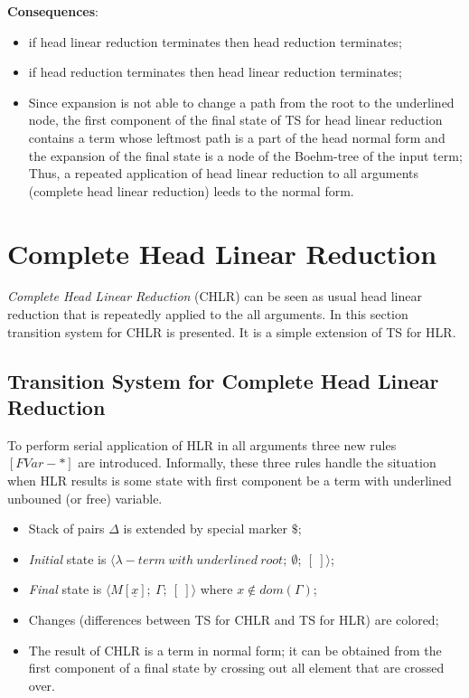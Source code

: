 \documentclass[a4paper, 10pt]{article}
\newcommand{\InContext}[2]{{#1}\left[{#2}\right]}
\begin{document}
\textbf{Consequences}:
\begin{itemize}
\item if head linear reduction terminates then head reduction terminates;
\item if head reduction terminates then head linear reduction terminates;
\item Since expansion is not able to change a path from the root to the underlined node,
  the first component of the final state of TS for head linear reduction
  contains a term whose leftmost path is a part of the head normal form 
  and the expansion of the final state is a node of the Boehm-tree of the input term; \\
  Thus, a repeated application of head linear reduction to all arguments
  (complete head linear reduction) leeds to the normal form.
\end{itemize}


\newpage
\section{Complete Head Linear Reduction}
\emph{Complete Head Linear Reduction} (CHLR) can be seen as usual head linear reduction that is repeatedly
applied to the all arguments.
In this section transition system for CHLR is presented. It is a simple extension of TS for HLR.

\subsection{Transition System for Complete Head Linear Reduction}

To perform serial application of HLR in all arguments three new rules $[FVar-*]$ are introduced.
Informally, these three rules handle the situation when HLR results is some state with first component
be a term with underlined unbouned (or free) variable.

\begin{itemize}
\item Stack of pairs $\Delta$ is extended by special marker $ \$ $;
\item \textit{Initial} state is $\langle \lambda-term\ with\ underlined\ root;\ \emptyset;\ [\ ] \rangle$;
\item \textit{Final} state is $\langle \InContext{M}{\underline{x}};\ \Gamma;\ [\ ] \rangle$
  where $x \not\in dom(\Gamma)$;
\item Changes (differences between TS for CHLR and TS for HLR) are {\color{red}colored};
\item The result of CHLR is a term in normal form; it can be obtained from the first component
  of a final state by crossing out all element that are crossed over.
\end{itemize}
\end{document}
